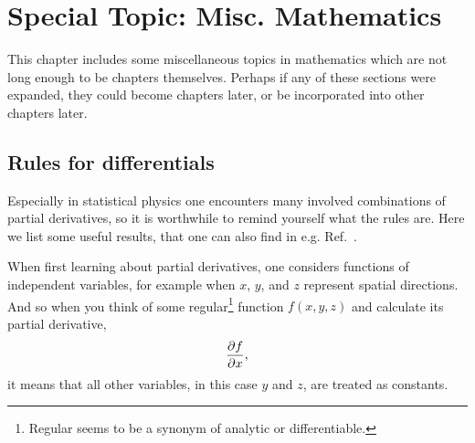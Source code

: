 \chapter{Special Topic: Misc. Mathematics}\label{ap:spec_math}

This chapter includes some miscellaneous topics in mathematics which are
not long enough to be chapters themselves. Perhaps if any of these sections
were expanded, they could become chapters later, or be incorporated into
other chapters later.

\section{Rules for differentials}

Especially in statistical physics one encounters many involved combinations
of partial derivatives, so it is worthwhile to remind yourself what the
rules are. Here we list some useful results, that one can also
find in e.g. Ref.~\cite{huang_introduction_2001}.

When first learning about partial derivatives, one considers functions
of independent variables, for example when $x$, $y$, and $z$ represent
spatial directions. And so when you think of some 
regular\footnote{Regular seems to be a synonym
of analytic or differentiable.} 
function $f(x,y,z)$
and calculate its partial derivative,
\begin{equation}
\pder[f]{x},
\end{equation} 
it means that all other variables, in this case $y$ and $z$, are treated as
constants.

